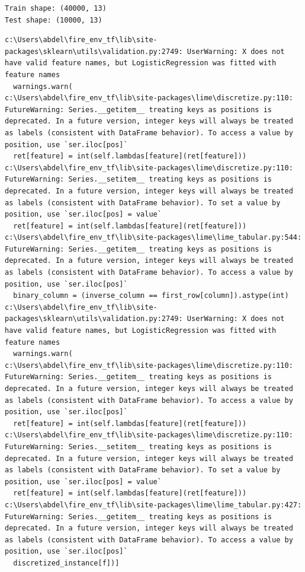 \documentclass[
  letterpaper,
  DIV=11,
  numbers=noendperiod]{scrartcl}
\begin{document}
\begin{verbatim}
Train shape: (40000, 13)
Test shape: (10000, 13)
\end{verbatim}

\begin{verbatim}
c:\Users\abdel\fire_env_tf\lib\site-packages\sklearn\utils\validation.py:2749: UserWarning: X does not have valid feature names, but LogisticRegression was fitted with feature names
  warnings.warn(
c:\Users\abdel\fire_env_tf\lib\site-packages\lime\discretize.py:110: FutureWarning: Series.__getitem__ treating keys as positions is deprecated. In a future version, integer keys will always be treated as labels (consistent with DataFrame behavior). To access a value by position, use `ser.iloc[pos]`
  ret[feature] = int(self.lambdas[feature](ret[feature]))
c:\Users\abdel\fire_env_tf\lib\site-packages\lime\discretize.py:110: FutureWarning: Series.__setitem__ treating keys as positions is deprecated. In a future version, integer keys will always be treated as labels (consistent with DataFrame behavior). To set a value by position, use `ser.iloc[pos] = value`
  ret[feature] = int(self.lambdas[feature](ret[feature]))
c:\Users\abdel\fire_env_tf\lib\site-packages\lime\lime_tabular.py:544: FutureWarning: Series.__getitem__ treating keys as positions is deprecated. In a future version, integer keys will always be treated as labels (consistent with DataFrame behavior). To access a value by position, use `ser.iloc[pos]`
  binary_column = (inverse_column == first_row[column]).astype(int)
c:\Users\abdel\fire_env_tf\lib\site-packages\sklearn\utils\validation.py:2749: UserWarning: X does not have valid feature names, but LogisticRegression was fitted with feature names
  warnings.warn(
c:\Users\abdel\fire_env_tf\lib\site-packages\lime\discretize.py:110: FutureWarning: Series.__getitem__ treating keys as positions is deprecated. In a future version, integer keys will always be treated as labels (consistent with DataFrame behavior). To access a value by position, use `ser.iloc[pos]`
  ret[feature] = int(self.lambdas[feature](ret[feature]))
c:\Users\abdel\fire_env_tf\lib\site-packages\lime\discretize.py:110: FutureWarning: Series.__setitem__ treating keys as positions is deprecated. In a future version, integer keys will always be treated as labels (consistent with DataFrame behavior). To set a value by position, use `ser.iloc[pos] = value`
  ret[feature] = int(self.lambdas[feature](ret[feature]))
c:\Users\abdel\fire_env_tf\lib\site-packages\lime\lime_tabular.py:427: FutureWarning: Series.__getitem__ treating keys as positions is deprecated. In a future version, integer keys will always be treated as labels (consistent with DataFrame behavior). To access a value by position, use `ser.iloc[pos]`
  discretized_instance[f])]
\end{verbatim}
\end{document}
